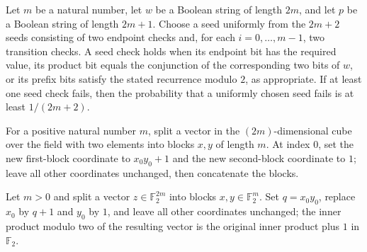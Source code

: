 \begin{theorem}
\label{FABL.one_div_checkCount_le_innerProduct_failedCheckProbability}
\leanok
{}
Let $m$ be a natural number, let $w$ be a Boolean string of length $2m$, and let $p$ be
a Boolean string of length $2m+1$. Choose a seed uniformly from the $2m+2$ seeds
consisting of two endpoint checks and, for each $i=0,\ldots,m-1$, two transition checks.
A seed check holds when its endpoint bit has the required value, its product bit equals
the conjunction of the corresponding two bits of $w$, or its prefix bits satisfy the
stated recurrence modulo $2$, as appropriate. If at least one seed check fails, then the
probability that a uniformly chosen seed fails is at least $1/(2m+2)$.
\end{theorem}

\begin{definition}
\label{FABL.innerProductFlipNeighborBinary}
\leanok
{}
For a positive natural number $m$, split a vector in the $(2m)$-dimensional cube over
the field with two elements into blocks $x,y$ of length $m$. At index $0$, set the new
first-block coordinate to $x_0y_0+1$ and the new second-block coordinate to $1$; leave
all other coordinates unchanged, then concatenate the blocks.
\end{definition}

\begin{theorem}
\label{FABL.innerProductModTwoBit_flipNeighborBinary}
\leanok
{}
Let $m>0$ and split a vector $z\in\mathbb F_2^{2m}$ into blocks $x,y\in\mathbb F_2^m$.
Set $q=x_0y_0$, replace $x_0$ by $q+1$ and $y_0$ by $1$, and leave all other coordinates
unchanged; the inner product modulo two of the resulting vector is the original inner
product plus $1$ in $\mathbb F_2$.
\end{theorem}

